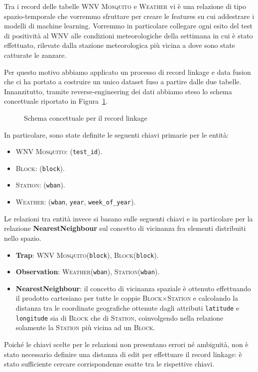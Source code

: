 Tra i record delle tabelle \textsc{WNV Mosquito} e \textsc{Weather} vi è una 
relazione di tipo spazio-temporale che vorremmo sfruttare per creare le 
features su cui addestrare i modelli di machine learning. Vorremmo in 
particolare collegare ogni esito del test di positività al WNV alle condizioni 
meteorologiche della settimana in cui è stato effettuato, rilevate dalla 
stazione meteorologica più vicina a dove sono state catturate le zanzare.

Per questo motivo abbiamo applicato un processo di record linkage e data fusion 
che ci ha portato a costruire un unico dataset fuso a partire dalle due 
tabelle. Innanzitutto, tramite reverse-engineering dei dati abbiamo steso lo 
schema concettuale riportato in Figura~\ref{fig:er-schema}. 

\begin{figure}[H]
    \centering
    \def\svgwidth{\columnwidth}
    \scalebox{.5}{
        
    }
    \caption{Schema concettuale per il record linkage}
    \label{fig:er-schema}
\end{figure}

In particolare, sono state definite le seguenti chiavi primarie per le entità:

\begin{itemize}
    \item \textsc{WNV Mosquito}: (\texttt{test\_id}).

    \item \textsc{Block}: (\texttt{block}).
    
    \item \textsc{Station}: (\texttt{wban}).
    
    \item \textsc{Weather}: (\texttt{wban}, \texttt{year}, 
    \texttt{week\_of\_year}).
\end{itemize}

Le relazioni tra entità invece si basano sulle seguenti chiavi e in particolare 
per la relazione \textbf{NearestNeighbour} sul concetto di vicinanza fra 
elementi distribuiti nello spazio.

\begin{itemize}
    \item \textbf{Trap}: \textsc{WNV Mosquito}(\texttt{block}), 
    \textsc{Block}(\texttt{block}).

    \item \textbf{Observation}:  \textsc{Weather}(\texttt{wban}), 
    \textsc{Station}(\texttt{wban}).
    
    \item \textbf{NearestNeighbour}: il concetto di vicinanza spaziale è 
    ottenuto effettuando il prodotto cartesiano per tutte le coppie
    \textsc{Block}$\times$\textsc{Station} e calcolando la distanza tra le 
    coordinate geografiche ottenute dagli attributi \texttt{latitude} e 
    \texttt{longitude} sia di \textsc{Block} che di \textsc{Station},
    coinvolgendo nella relazione solamente la \textsc{Station} più vicina ad 
    un \textsc{Block}.
\end{itemize}

Poiché le chiavi scelte per le relazioni non presentano errori né ambiguità, 
non è stato necessario definire una distanza di edit per effettuare il record 
linkage: è stato sufficiente cercare corrispondenze esatte tra le rispettive 
chiavi.
